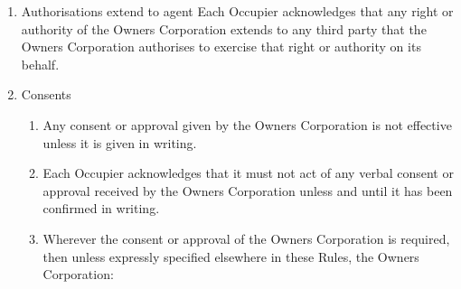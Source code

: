 \documentclass{article}
\begin{document}
\begin{enumerate}[label=\arabic*.]
\begin{enumerate}[label=\arabic{enumi}.\arabic*.]
\begin{enumerate}[label=\arabic{enumi}.\arabic*.]
\begin{enumerate}[label=(\arabic*)]
\item  A provision of these Rules must not be construed to the disadvantage of a party merely because that party was responsible for the preparation of the Rules;

\item  If an act must be done on a specified day which is not a Business Day, it must be done instead on the next Business Day;

\item  If two or more people are described as a party, each person is liable for their obligations and entitled to their rights jointly and severally; and

\item  A reference to all or any part of a statute, ordinance or other law (statute) includes:

\begin{enumerate}[label=(\alph*)]

\item  Any rules, regulations or other instruments made under that statute; and

\item  That statute as amended, consolidated, re-enacted or replaced from time to time.

\end{enumerate}

\end{enumerate}

\item  Authorisations extend to agent Each Occupier acknowledges that any right or authority of the Owners Corporation extends to any third party that the Owners Corporation authorises to exercise that right or authority on its behalf.
\newpage



\item  Consents

\begin{enumerate}[label=(\arabic*)]

\item  Any consent or approval given by the Owners Corporation is not effective unless it is given in writing.

\item  Each Occupier acknowledges that it must not act of any verbal consent or approval received by the Owners Corporation unless and until it has been confirmed in writing.

\item  Wherever the consent or approval of the Owners Corporation is required, then unless expressly specified elsewhere in these Rules, the Owners Corporation:


\end{enumerate}
\end{enumerate}
\end{enumerate}
\end{enumerate}
\end{document}
